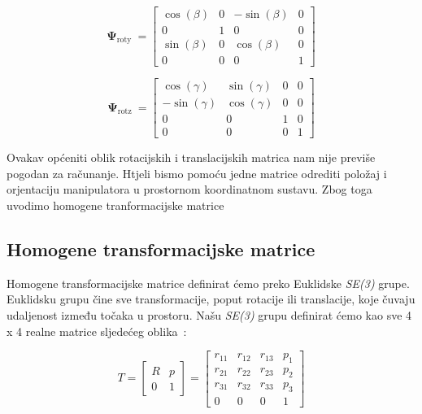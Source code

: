 \documentclass[times, utf8, diplomskirad]{fer}
\begin{document}
\begin{equation}
    \boldsymbol{\Psi}_{\text {roty }}=\left[\begin{array}{cccc}
        \cos (\beta) & 0 & -\sin (\beta) & 0 \\
        0 & 1 & 0 & 0 \\
        \sin (\beta) & 0 & \cos (\beta) & 0 \\
        0 & 0 & 0 & 1
    \end{array}\right]
    \label{eq:rotacija-y-matrica}
\end{equation}

\begin{equation}
    \boldsymbol{\Psi}_{\text {rotz }}=\left[\begin{array}{cccc}
    \cos (\gamma) & \sin (\gamma) & 0 & 0 \\
    -\sin (\gamma) & \cos (\gamma) & 0 & 0 \\
    0 & 0 & 1 & 0 \\
    0 & 0 & 0 & 1
    \end{array}\right]
    \label{eq:rotacija-z-matrica}
\end{equation}
\hfill

Ovakav općeniti oblik rotacijskih i translacijskih matrica nam nije previše pogodan za računanje.
Htjeli bismo pomoću jedne matrice odrediti položaj i orjentaciju manipulatora u prostornom koordinatnom sustavu.
Zbog toga uvodimo homogene tranformacijske matrice
\newpage
\subsection{Homogene transformacijske matrice}
Homogene transformacijske matrice definirat ćemo preko Euklidske \textit{SE(3)} grupe.
Euklidsku grupu čine sve transformacije, poput rotacije ili translacije, koje čuvaju udaljenost između točaka u prostoru.
Našu \textit{SE(3)} grupu definirat ćemo kao sve 4 x 4 realne matrice sljedećeg oblika~\cite{10.5555/3165183}:

\begin{equation}
    T=\left[\begin{array}{cc}
    R & p \\
    0 & 1
    \end{array}\right]=\left[\begin{array}{cccc}
    r_{11} & r_{12} & r_{13} & p_1 \\
    r_{21} & r_{22} & r_{23} & p_2 \\
    r_{31} & r_{32} & r_{33} & p_3 \\
    0 & 0 & 0 & 1
    \end{array}\right]
    \label{eq:transformacijska matrica}
\end{equation}
\end{document}

